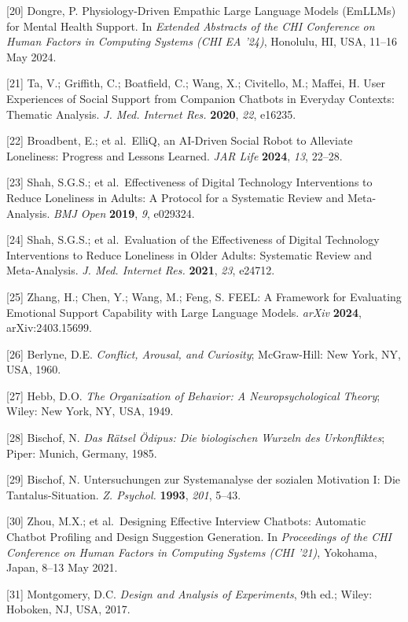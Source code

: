\documentclass[apajournal,article,submit,moreauthors]{Definitions/mdpi}
\begin{document}
{[}20{]} Dongre, P. Physiology-Driven Empathic Large Language Models (EmLLMs) for Mental Health Support. In \emph{Extended Abstracts of the CHI Conference on Human Factors in Computing Systems (CHI EA '24)}, Honolulu, HI, USA, 11--16 May 2024.

{[}21{]} Ta, V.; Griffith, C.; Boatfield, C.; Wang, X.; Civitello, M.; Maffei, H. User Experiences of Social Support from Companion Chatbots in Everyday Contexts: Thematic Analysis. \emph{J. Med. Internet Res.} \textbf{2020}, \emph{22}, e16235.

{[}22{]} Broadbent, E.; et al.~ElliQ, an AI-Driven Social Robot to Alleviate Loneliness: Progress and Lessons Learned. \emph{JAR Life} \textbf{2024}, \emph{13}, 22--28.

{[}23{]} Shah, S.G.S.; et al.~Effectiveness of Digital Technology Interventions to Reduce Loneliness in Adults: A Protocol for a Systematic Review and Meta-Analysis. \emph{BMJ Open} \textbf{2019}, \emph{9}, e029324.

{[}24{]} Shah, S.G.S.; et al.~Evaluation of the Effectiveness of Digital Technology Interventions to Reduce Loneliness in Older Adults: Systematic Review and Meta-Analysis. \emph{J. Med. Internet Res.} \textbf{2021}, \emph{23}, e24712.

{[}25{]} Zhang, H.; Chen, Y.; Wang, M.; Feng, S. FEEL: A Framework for Evaluating Emotional Support Capability with Large Language Models. \emph{arXiv} \textbf{2024}, arXiv:2403.15699.

{[}26{]} Berlyne, D.E. \emph{Conflict, Arousal, and Curiosity}; McGraw-Hill: New York, NY, USA, 1960.

{[}27{]} Hebb, D.O. \emph{The Organization of Behavior: A Neuropsychological Theory}; Wiley: New York, NY, USA, 1949.

{[}28{]} Bischof, N. \emph{Das Rätsel Ödipus: Die biologischen Wurzeln des Urkonfliktes}; Piper: Munich, Germany, 1985.

{[}29{]} Bischof, N. Untersuchungen zur Systemanalyse der sozialen Motivation I: Die Tantalus-Situation. \emph{Z. Psychol.} \textbf{1993}, \emph{201}, 5--43.

{[}30{]} Zhou, M.X.; et al.~Designing Effective Interview Chatbots: Automatic Chatbot Profiling and Design Suggestion Generation. In \emph{Proceedings of the CHI Conference on Human Factors in Computing Systems (CHI '21)}, Yokohama, Japan, 8--13 May 2021.

{[}31{]} Montgomery, D.C. \emph{Design and Analysis of Experiments}, 9th ed.; Wiley: Hoboken, NJ, USA, 2017.
\end{document}
